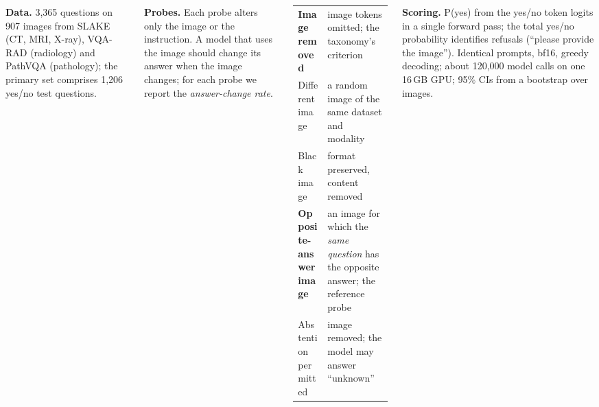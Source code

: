 \documentclass[25pt, a0paper, portrait, margin=0mm, innermargin=16mm, blockverticalspace=10mm, colspace=14mm,
  subcolspace=8mm]{tikzposter}
\begin{document}
\begin{columns}
{\vspace{4mm}
\textbf{Data.} 3,365 questions on 907 images from SLAKE (CT, MRI, X-ray), VQA-RAD (radiology) and PathVQA
(pathology); the primary set comprises 1,206 yes/no test questions.

\vspace{4mm}
\textbf{Probes.} Each probe alters only the image or the instruction. A model that uses the image should change its
answer when the image changes; for each probe we report the \emph{answer-change rate}.

\vspace{3mm}
{\renewcommand{\arraystretch}{1.25}
\begin{tabular}{@{}>{\raggedright\arraybackslash}p{0.30\linewidth}>{\raggedright\arraybackslash}p{0.66\linewidth}@{}}
\toprule
\textbf{Image removed} & image tokens omitted; the taxonomy's criterion\\
Different image & a random image of the same dataset and modality\\
Black image & format preserved, content removed\\
\textbf{Opposite-answer image} & an image for which the \emph{same question} has the opposite answer; the
reference probe\\
Abstention permitted & image removed; the model may answer ``unknown''\\
\bottomrule
\end{tabular}}

\vspace{4mm}
\textbf{Scoring.} P(yes) from the yes/no token logits in a single forward pass; the total yes/no probability
identifies refusals (``please provide the image''). Identical prompts, bf16, greedy decoding; about 120,000 model
calls on one 16\,GB GPU; 95\% CIs from a bootstrap over images.

\vspace{4mm}
}

\end{columns}
\end{document}
